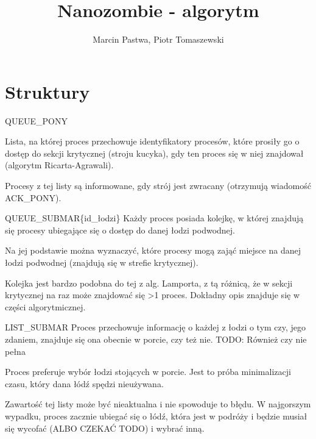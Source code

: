 \documentclass{beamer}
\title[Nanozombie]{Nanozombie - algorytm}
\author{Marcin Pastwa, Piotr Tomaszewski}
\date{}
\begin{document}
\begin{frame}
  \titlepage
\end{frame}


\section{Struktury}

\begin{frame}{QUEUE\_PONY}
\internallinenumbers
    \resetlinenumber[1]

    Lista, na której proces przechowuje identyfikatory procesów, które prosiły go o dostęp do sekcji krytycznej (stroju kucyka), gdy ten proces się w niej znajdował (algorytm Ricarta-Agrawali).

    \vspace{1cm}
    Procesy z tej listy są informowane, gdy strój jest zwracany  (otrzymują wiadomość ACK\_PONY).
\end{frame}

\begin{frame}{QUEUE\_SUBMAR\{id\_łodzi\}}
    \internallinenumbers
    \resetlinenumber[1]
    Każdy proces posiada kolejkę, w której znajdują się procesy ubiegające się o dostęp do danej łodzi podwodnej.
    
    \vspace{1cm}
    Na jej podstawie można wyznaczyć, które procesy mogą zająć miejsce na danej łodzi podwodnej (znajdują się w strefie krytycznej).

    \vspace{1cm}
    Kolejka jest bardzo podobna do tej z alg. Lamporta, z tą różnicą, że w sekcji krytycznej na raz może znajdować się >1 proces. Dokładny opis znajduje się w części algorytmicznej.
\end{frame}

\begin{frame}{LIST\_SUBMAR}
    \internallinenumbers
    \resetlinenumber[1]
    Proces przechowuje informację o każdej z łodzi o tym czy, jego zdaniem, znajduje się ona obecnie w porcie, czy też nie.
    TODO: Również czy nie pełna
    
    \vspace{1cm}
    Proces preferuje wybór łodzi stojących w porcie. Jest to próba minimalizacji czasu, który dana łódź spędzi nieużywana.

    \vspace{1cm}
    Zawartość tej listy może być nieaktualna i nie spowoduje to błędu. W najgorszym wypadku, proces zacznie ubiegać się o łódź, która jest w podróży i będzie musiał się wycofać (ALBO CZEKAĆ TODO) i wybrać inną.
\end{frame}
\end{document}
